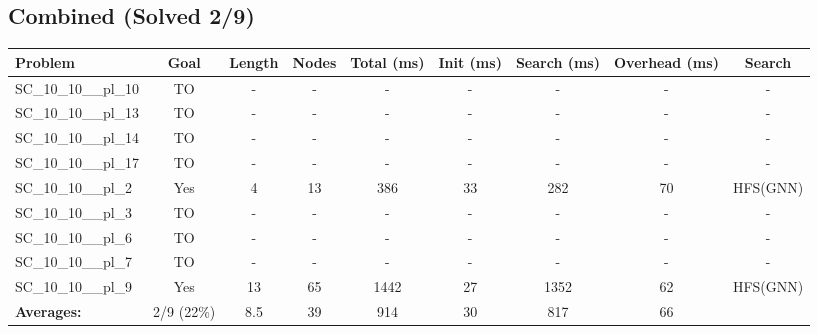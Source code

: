\documentclass{article}
\begin{document}
\subsection*{Combined (Solved 2/9)}
\begin{tabular}{lcccccccc}
\toprule
Problem & Goal & Length & Nodes & Total (ms) & Init (ms) & Search (ms) & Overhead (ms) & Search \\
\midrule
SC\_10\_10\_\_pl\_10 & TO & - & - & - & - & - & - & - \\
SC\_10\_10\_\_pl\_13 & TO & - & - & - & - & - & - & - \\
SC\_10\_10\_\_pl\_14 & TO & - & - & - & - & - & - & - \\
SC\_10\_10\_\_pl\_17 & TO & - & - & - & - & - & - & - \\
SC\_10\_10\_\_pl\_2 & Yes & 4 & 13 & 386 & 33 & 282 & 70 & HFS(GNN) \\
SC\_10\_10\_\_pl\_3 & TO & - & - & - & - & - & - & - \\
SC\_10\_10\_\_pl\_6 & TO & - & - & - & - & - & - & - \\
SC\_10\_10\_\_pl\_7 & TO & - & - & - & - & - & - & - \\
SC\_10\_10\_\_pl\_9 & Yes & 13 & 65 & 1442 & 27 & 1352 & 62 & HFS(GNN) \\
\textbf{Averages:} & 2/9 (22\%) & 8.5 & 39 & 914 & 30 & 817 & 66 & \\
\bottomrule
\end{tabular}
\\[0.7cm]
\end{document}
